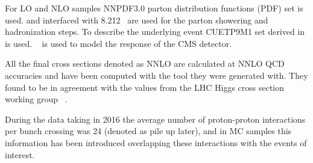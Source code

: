 For LO and NLO samples NNPDF3.0 parton distribution functions (PDF)
set is used. {\POWHEG} and {\MADGRAPH} interfaced with
{\PYTHIA}8.212~\cite{Sjostrand:2007gs} are used for the parton
showering and hadronization steps. To describe the underlying event
CUETP9M1 set derived in \cite{Khachatryan:2015pea} is
used. \GEANTfour~\cite{GEANT4} is used to model the response of the
CMS detector.

All the final cross sections denoted as NNLO are calculated at NNLO QCD accuracies and have been computed with the tool they were generated with. They found to be in agreement with the values from the LHC Higgs cross section working group ~\cite{LHCHXSWG, xsecZH, xsecTT, xsecST, xsecVV}.

During the data taking in 2016 the average number of proton-proton interactions per bunch crossing was 24 (denoted as pile up later), and in MC samples this information has been introduced overlapping these interactions with the events of interest.



